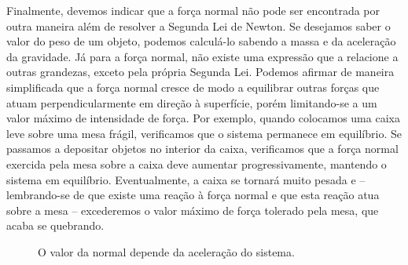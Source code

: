 Finalmente, devemos indicar que a força normal não pode ser encontrada por outra maneira além de resolver a Segunda Lei de Newton. Se desejamos saber o valor do peso de um objeto, podemos calculá-lo sabendo a massa e da aceleração da gravidade. Já para a força normal, não existe uma expressão que a relacione a outras grandezas, exceto pela própria Segunda Lei. Podemos afirmar de maneira simplificada que a força normal cresce de modo a equilibrar outras forças que atuam perpendicularmente em direção à superfície, porém limitando-se a um valor máximo de intensidade de força. Por exemplo, quando colocamos uma caixa leve sobre uma mesa frágil, verificamos que o sistema permanece em equilíbrio. Se passamos a depositar objetos no interior da caixa, verificamos que a força normal exercida pela mesa sobre a caixa deve aumentar progressivamente, mantendo o sistema em equilíbrio. Eventualmente, a caixa se tornará muito pesada e -- lembrando-se de que existe uma reação à força normal e que esta reação atua sobre a mesa -- excederemos o valor máximo de força tolerado pela mesa, que acaba se quebrando.

\begin{figure}[!h]
\centering
{}
\caption{O valor da normal depende da aceleração do sistema.}
\end{figure}

